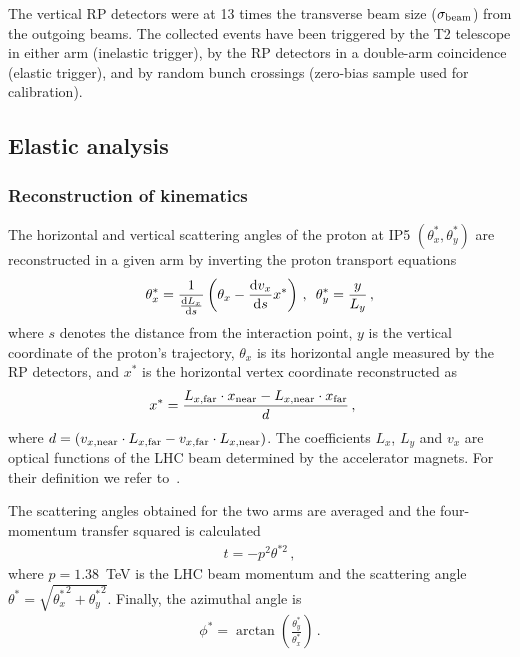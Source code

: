 \documentclass[TOTEM]{cernphprep}
\begin{document}
The vertical RP detectors were at 13 times the transverse beam size ($\sigma_{\rm beam}$) from the outgoing beams. The collected events have been triggered by the T2
telescope in either arm (inelastic trigger), by the RP detectors in a double-arm coincidence (elastic trigger), and by
random bunch crossings (zero-bias sample used for calibration).

	\subsection{Elastic analysis}

	\subsubsection{Reconstruction of kinematics}
		The horizontal and vertical scattering angles of the proton at IP5 $(\theta_{x}^{*},\theta_{y}^{*})$  are reconstructed in a given arm by inverting the proton transport
		equations~\cite{Antchev:2014voa}
			\begin{align}
			    \theta_{x}^{*} = \frac{1}{\frac{{\rm d}L_{x}}{{\rm d}s}}\left(\theta_{x}-\frac{{\rm d} v_{x}}{{\rm d} s}x^{*}\right)\,,\,\,\,
    			    \theta^{*}_{y} = \frac{y}{L_{y}}\,,
			    \label{reconstruction_formula_theta_x_rearranged}
			\end{align}
			where $s$ denotes the distance from the interaction point, $y$ is the vertical coordinate of the proton's trajectory, $\theta_{x}$ is its horizontal
			angle measured by the RP detectors, and $x^{*}$ is the horizontal vertex coordinate reconstructed as
			\begin{align}
			    x^{*}&=\frac{L_{x,{\rm far}}\cdot x_{\rm near} - L_{x,{\rm near}}\cdot x_{\rm far}}{d}\,,
			    \label{reconstruction_formula_x_star}
			\end{align}
			where $d=( v_{x,{\rm near}}\cdot L_{x,{\rm far}} -  v_{x,{\rm far}}\cdot L_{x,{\rm near}})$. The coefficients $L_{x}$, $L_{y}$ and $v_{x}$ are optical functions of the LHC beam determined by the
			accelerator magnets. For their definition we refer to~\cite{Antchev:2014voa}.

			The scattering angles obtained for the two arms are averaged and the four-momentum transfer squared is calculated
			\begin{align}
			    t=-p^{2}\theta^{*2}\,,
			    \label{reconstructed_t}
			\end{align}
		where $p=1.38$~TeV is the LHC beam momentum and the scattering angle $\theta^{*}=\sqrt{{\theta_{x}^{*}}^{2} + {\theta_{y}^{*}}^{2}}$. Finally, the azimuthal angle is 
			\begin{align}
				\phi^{*}=\arctan\left(\frac{\theta_{y}^{*}}{\theta_{x}^{*}}\right)\,.
			    \label{phistar}
			\end{align}
\end{document}
